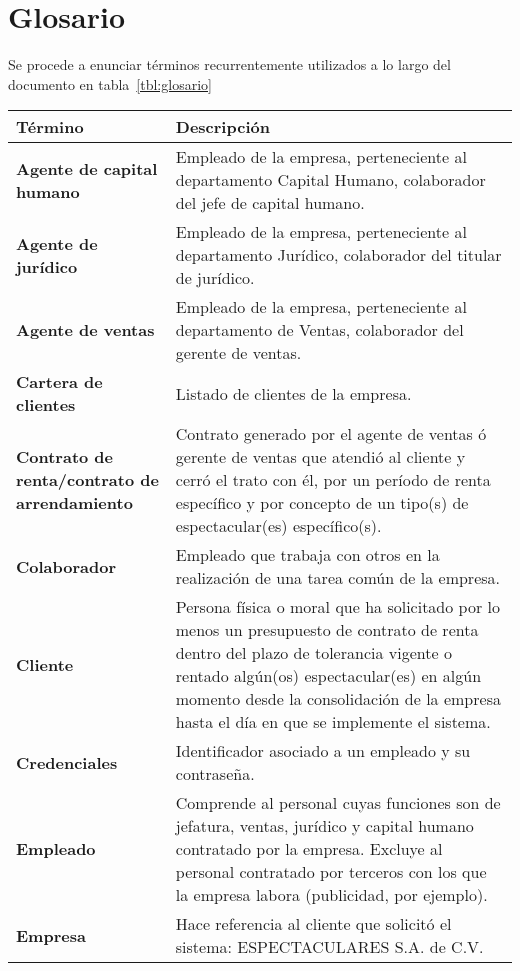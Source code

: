 \chapter{Glosario}	
Se procede a enunciar términos recurrentemente utilizados a lo largo del documento en tabla~\ref{tbl:glosario}
\begin{longtable}[H]{m{4cm}m{8cm}}
\toprule
\centering \textbf{Término} & \centering  \textbf{Descripción} \tabularnewline
\midrule

\textbf{Agente de capital humano} & Empleado de la empresa, perteneciente al departamento Capital Humano, colaborador del jefe de capital humano. \tabularnewline

\textbf{Agente de jurídico} & Empleado de la empresa, perteneciente al departamento Jurídico, colaborador del titular de jurídico. \tabularnewline

\textbf{Agente de ventas} & Empleado de la empresa, perteneciente al departamento de Ventas, colaborador del gerente de ventas. \tabularnewline

\textbf{Cartera de clientes} & Listado de clientes de la empresa. \tabularnewline
\bottomrule

\textbf{Contrato de renta/contrato de arrendamiento} & Contrato generado por el agente de ventas ó gerente de ventas que atendió al cliente y cerró el trato con él, por un período de renta específico y por concepto de un tipo(s) de espectacular(es) específico(s). \tabularnewline

\textbf{Colaborador} & Empleado que trabaja con otros en la realización de una tarea común de la empresa. \tabularnewline

\textbf{Cliente} & Persona física o moral que ha solicitado por lo menos un presupuesto de contrato de renta dentro del plazo de tolerancia vigente o rentado algún(os) espectacular(es) en algún momento desde la consolidación de la empresa hasta el día en que se implemente el sistema. \tabularnewline

\textbf{Credenciales} & Identificador asociado a un empleado y su contraseña. \tabularnewline

\textbf{Empleado} &  Comprende al personal cuyas funciones son de jefatura, ventas, jurídico y capital humano contratado por la empresa. Excluye al personal contratado por terceros con los que la empresa labora (publicidad, por ejemplo).\tabularnewline

\textbf{Empresa} & Hace referencia al cliente que solicitó el sistema: ESPECTACULARES S.A. de C.V.\tabularnewline


\end{longtable}
